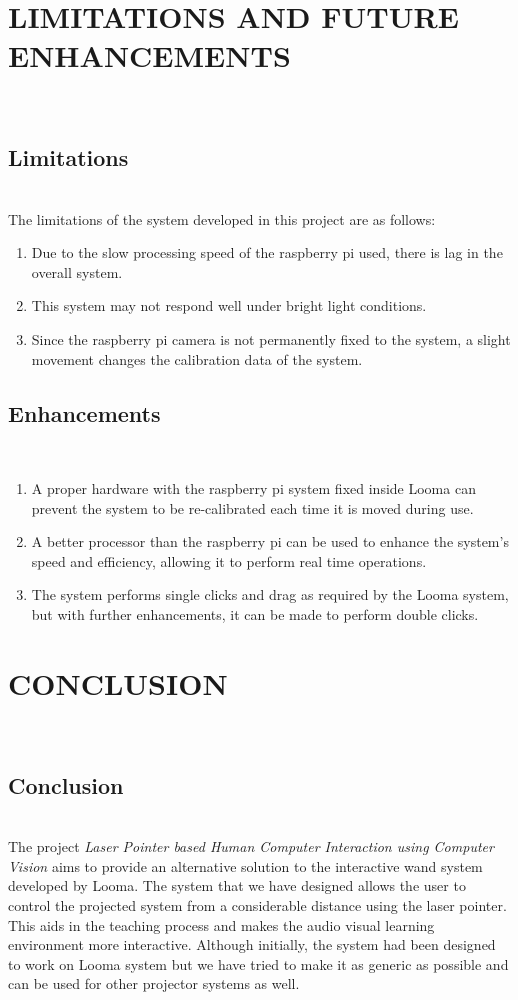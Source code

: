 \documentclass[12pt, a4paper]{article}
\begin{document}
{\section{LIMITATIONS AND FUTURE ENHANCEMENTS}
~\\
\subsection{Limitations}
~\\
The limitations of the system developed in this project are as follows:

\begin{enumerate}
\item Due to the slow processing speed of the raspberry pi used, there is lag in the overall system. 
\item This system may not respond well under bright light conditions.
\item Since the raspberry pi camera is not permanently fixed to the system, a slight movement changes the calibration data of the system.

\end{enumerate}

\subsection{Enhancements}
~\\
\begin{enumerate}
\item A proper hardware with the raspberry pi system fixed inside Looma can prevent the system to be re-calibrated each time it is moved during use.
\item A better processor than the raspberry pi can be used to enhance the system’s speed and efficiency, allowing it to perform real time operations.
\item The system performs single clicks and drag as required by the Looma system, but with further enhancements, it can be made to perform double clicks.
\end{enumerate}
\newpage
\section{CONCLUSION}
~\\
\subsection{Conclusion}
~\\
The project \emph{Laser Pointer based Human Computer Interaction using Computer Vision} aims to provide an alternative solution to the interactive wand system developed by Looma. The system that we have designed allows the user to control the projected system from a considerable distance using the laser pointer. This aids in the teaching process and makes the audio visual learning environment more interactive. Although initially, the system had been designed to work on Looma system but we have tried to make it as generic as possible and can be used for other projector systems as well. 

}
\end{document}

